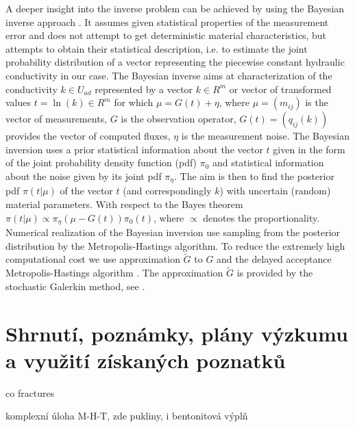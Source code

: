 \documentclass[a4paper]{article}
\begin{document}
A deeper insight into the inverse problem can be achieved by using the
Bayesian inverse approach \cite{4}. It assumes given statistical properties of
the measurement error and does not attempt to get deterministic material
characteristics, but attempts to obtain their statistical description, i.e.
to estimate the joint probability distribution of a vector representing the
piecewise constant hydraulic conductivity in our case. The Bayesian inverse
aims at characterization of the conductivity $k \in U_{ad}$ represented by a vector
$k\in R^m$ or vector of transformed values $t=\ln(k)\in R^m$ for which $\mu=G(t)+\eta$,
where $\mu=(m_{ij})$ is the vector of measurements, $G$ is the observation operator,
$G(t)=(q_{ij} (k))$ provides the vector of computed fluxes, $\eta$ is the measurement
noise. The Bayesian inversion uses a prior statistical information about the
vector $t$ given in the form of the joint probability density function (pdf) $\pi_0$
and statistical information about the noise given by its joint pdf $\pi_{\eta}$. The
aim is then to find the posterior pdf $\pi(t|\mu)$ of the vector $t$ (and correspondingly
$k$) with uncertain (random) material parameters. With respect to the
Bayes theorem $\pi(t|\mu)\propto\pi_{\eta}(\mu-G(t)) \pi_0(t)$, where $\propto$ denotes the proportionality.
Numerical realization of the Bayesian inversion use sampling from the
posterior distribution by the Metropolis-Hastings algorithm. To reduce the
extremely high computational cost we use approximation $\tilde{G}$ to $G$ and the
delayed acceptance Metropolis-Hastings algorithm \cite{5}. The approximation
$\tilde{G}$ is provided by the stochastic Galerkin method, see \cite{5,6,7}.

\section{Shrnutí, poznámky, plány výzkumu a využití získaných poznatků}

co fractures

komplexní úloha M-H-T, zde pukliny, i bentonitová výplň
\end{document}
